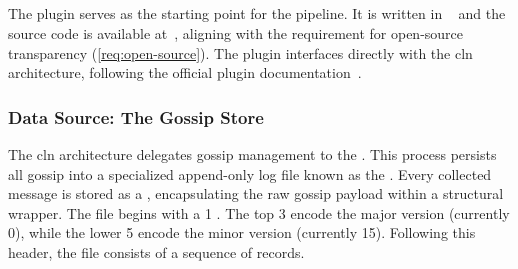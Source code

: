 \subsection{}
The  plugin serves as the starting point for the pipeline. 
It is written in ~\cite{pythonsoftwarefoundation_python_2025} and 
the source code is available at~\cite{kraus_gossippublisherzmq_2026},
aligning with the requirement for open-source transparency (\ref{req:open-source}).
The plugin interfaces directly with the \gls{cln} architecture, following the 
official plugin documentation~\cite{corelightningdevelopers_cln_2026}.

\subsubsection{Data Source: The Gossip Store}
The \gls{cln} architecture delegates gossip management to the . 
This process persists all gossip into a specialized append-only log file known as the . 
Every collected message is stored as a , encapsulating the raw gossip payload within a structural wrapper.
The file begins with a \qty{1}{\byte} . 
The top \qty{3}{\bit} encode the major version (currently \num{0}), 
while the lower \qty{5}{\bit} encode the minor version (currently \num{15}). 
Following this header, the file consists of a sequence of records. 

